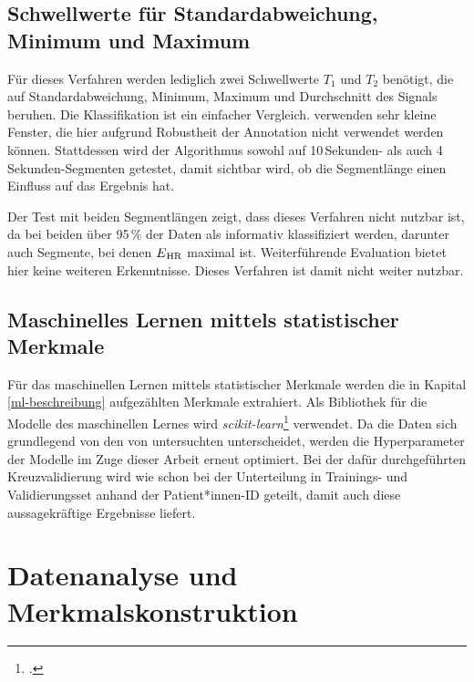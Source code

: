 \subsection{Schwellwerte für Standardabweichung, Minimum und Maximum}

Für dieses Verfahren werden lediglich zwei Schwellwerte $T_1$ und $T_2$ benötigt, die auf Standardabweichung, Minimum, Maximum und Durchschnitt des Signals beruhen. Die Klassifikation ist ein einfacher Vergleich. \citeauthor{Pino2015} verwenden sehr kleine Fenster, die hier aufgrund Robustheit der Annotation nicht verwendet werden können. Stattdessen wird der Algorithmus sowohl auf 10\,Sekunden- als auch 4\,Sekunden-Segmenten getestet, damit sichtbar wird, ob die Segmentlänge einen Einfluss auf das Ergebnis hat.

Der Test mit beiden Segmentlängen zeigt, dass dieses Verfahren nicht nutzbar ist, da bei beiden über 95\,\% der Daten als informativ klassifiziert werden, darunter auch Segmente, bei denen $E\textsubscript{HR}$ maximal ist. Weiterführende Evaluation bietet hier keine weiteren Erkenntnisse. Dieses Verfahren ist damit nicht weiter nutzbar.

\subsection{Maschinelles Lernen mittels statistischer Merkmale}

Für das maschinellen Lernen mittels statistischer Merkmale werden die in Kapital \ref{ml-beschreibung} aufgezählten Merkmale extrahiert. Als Bibliothek für die Modelle des maschinellen Lernes wird \textit{scikit-learn}\footcite[]{scikit-learn} verwendet. Da die Daten sich grundlegend von den von \citeauthor{Sadek2016} untersuchten unterscheidet, werden die Hyperparameter der Modelle im Zuge dieser Arbeit erneut optimiert. Bei der dafür durchgeführten Kreuzvalidierung wird wie schon bei der Unterteilung in Trainings- und Validierungsset anhand der Patient*innen-ID geteilt, damit auch diese aussagekräftige Ergebnisse liefert.

\section{Datenanalyse und Merkmalskonstruktion}


